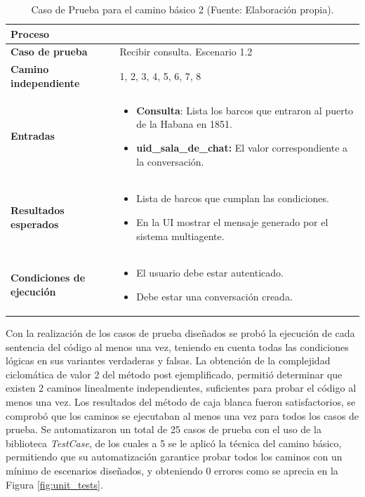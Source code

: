\begin{longtable}{|p{4cm}|p{11cm}|}
	\caption{Caso de Prueba para el camino básico 2 (Fuente: Elaboración propia).}
	\label{tab:caminos-grafo}\\
	\hline
	\textbf{Proceso} &  \\ \hline
	\textbf{Caso de prueba} & Recibir consulta. Escenario 1.2 \\ \hline
	\textbf{Camino independiente} & 1, 2, 3, 4, 5, 6, 7, 8 \\ \hline
	\textbf{Entradas} &
	\begin{itemize}
		\item \textbf{Consulta}: Lista los barcos que entraron al puerto de la Habana en 1851.
		\item \textbf{uid\_sala\_de\_chat:} El valor correspondiente a la conversación.
	\end{itemize} \\ \hline
	\textbf{Resultados esperados} &
	\begin{itemize}
		\item Lista de barcos que cumplan las condiciones.
		\item En la UI mostrar el mensaje generado por el sistema multiagente.
	\end{itemize} \\ \hline
	
	\textbf{Condiciones de ejecución} &
	\begin{itemize}
		\item El usuario debe estar autenticado.
		\item Debe estar una conversación creada.
	\end{itemize} \\ \hline
\end{longtable}

Con la realización de los casos de prueba diseñados se probó la ejecución de cada sentencia del código al
menos una vez, teniendo en cuenta todas las condiciones lógicas en sus variantes verdaderas y falsas. La
obtención de la complejidad ciclomática de valor 2 del método post ejemplificado, permitió determinar que existen 2 caminos
linealmente independientes, suficientes para probar el código al menos una vez.
Los resultados del método de caja blanca fueron satisfactorios, se comprobó que los caminos se ejecutaban al menos una vez para todos los casos de prueba. Se automatizaron un total de 25 casos de prueba con el uso de la biblioteca \textit{TestCase}, de los cuales a 5 se le aplicó la técnica del camino básico, permitiendo que su automatización garantice probar todos los caminos con un mínimo de escenarios diseñados,
y obteniendo 0 errores como se aprecia en la Figura \ref{fig:unit_tests}.


